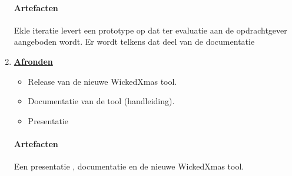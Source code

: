\begin{enumerate}
		\paragraph{Artefacten}
		Ekle iteratie levert een prototype op dat ter evaluatie aan de opdrachtgever aangeboden wordt. Er wordt telkens dat deel van de documentatie
	
	
\item \underline{\textbf{Afronden}}
	\begin{itemize}
		\item Release van de nieuwe WickedXmas tool.
		\item Documentatie van de tool (handleiding).
		\item Presentatie
	\end{itemize}
	\paragraph{Artefacten}
	Een presentatie , documentatie en de nieuwe WickedXmas tool.

\end{enumerate}








